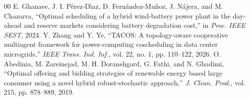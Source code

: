 \documentclass[journal]{IEEEtran}
\begin{document}
\begin{thebibliography}{00}
 E. Ghanaee, J. I. P{\'e}rez-D{\'\i}az, D. Fern{\'a}ndez-Mu{\~n}oz, J. N{\'a}jera, and M. Chazarra, ``Optimal scheduling of a hybrid wind-battery power plant in the day-ahead and reserve markets considering battery degradation cost,'' in \emph{Proc. IEEE SEST}, 2024.
 Y. Zhang and Y. Ye, ``TACOS: A topology-aware cooperative multiagent framework for power-computing coscheduling in data center microgrids,'' \emph{IEEE Trans. Ind. Inf.}, vol. 22, no. 1, pp. 110--122, 2026.
 O. Abedinia, M. Zareinejad, M. H. Doranehgard, G. Fathi, and N. Ghadimi, ``Optimal offering and bidding strategies of renewable energy based large consumer using a novel hybrid robust-stochastic approach,'' \emph{J. Clean. Prod.}, vol. 215, pp. 878--889, 2019.


\end{thebibliography}
\end{document}
